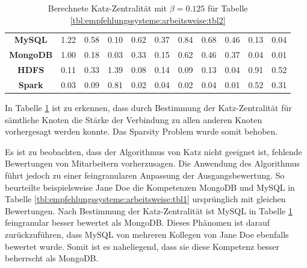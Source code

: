\begin{table}[h]
\begin{tabular}{c|c|c|c|c|c|c|c|c|c|c}
		\textbf{MySQL}    & 1.22 & 0.58 & 0.10 & 0.62 & 0.37 & 0.84 & 0.68 & 0.46 & 0.13 & 0.04\\
		\textbf{MongoDB}  & 1.00 & 0.18 & 0.03 & 0.33 & 0.15 & 0.62 & 0.46 & 0.37 & 0.04 & 0.01\\
		\textbf{HDFS}     & 0.11 & 0.33 & 1.39 & 0.08 & 0.14 & 0.09 & 0.13 & 0.04 & 0.91 & 0.52\\
		\textbf{Spark}    & 0.03 & 0.09 & 0.81 & 0.02 & 0.04 & 0.02 & 0.04 & 0.01 & 0.52 & 0.31
	\end{tabular}
	\caption{Berechnete Katz-Zentralität mit $\beta = 0.125$ für Tabelle \ref{tbl:empfehlungssysteme:arbeitsweise:tbl2}}
	\label{tbl:empfehlungssysteme:arbeitsweise:tbl3}
\end{table}

In Tabelle \ref{tbl:empfehlungssysteme:arbeitsweise:tbl3} ist zu erkennen, dass durch Bestimmung der Katz-Zentralität für sämtliche Knoten die Stärke der Verbindung zu allen anderen Knoten vorhergesagt werden konnte. Das Sparsity Problem wurde somit behoben.

Es ist zu beobachten, dass der Algorithmus von Katz nicht geeignet ist, fehlende Bewertungen von Mitarbeitern vorherzusagen. Die Anwendung des Algorithmus führt jedoch zu einer feingranularen Anpassung der Ausgangsbewertung. So beurteilte beispielsweise Jane Doe die Kompetenzen MongoDB und MySQL in Tabelle \ref{tbl:empfehlungssysteme:arbeitsweise:tbl1} ursprünglich mit gleichen Bewertungen. Nach Bestimmung der Katz-Zentralität ist MySQL in Tabelle \ref{tbl:empfehlungssysteme:arbeitsweise:tbl3} feingranular besser bewertet als MongoDB. Dieses Phänomen ist darauf zurückzuführen, dass MySQL von mehreren Kollegen von Jane Doe ebenfalls bewertet wurde. Somit ist es naheliegend, dass sie diese Kompetenz besser beherrscht als MongoDB.

